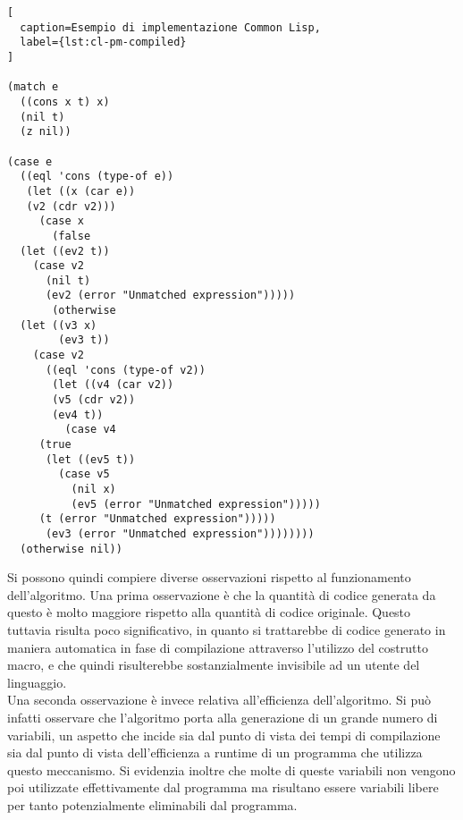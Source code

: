 
\begin{lstlisting}[
  caption=Esempio di implementazione Common Lisp,
  label={lst:cl-pm-compiled}
]

(match e
  ((cons x t) x)
  (nil t)
  (z nil))

(case e
  ((eql 'cons (type-of e))
   (let ((x (car e))
   (v2 (cdr v2)))
     (case x
       (false
  (let ((ev2 t))
    (case v2
      (nil t)
      (ev2 (error "Unmatched expression")))))
       (otherwise
  (let ((v3 x)
        (ev3 t))
    (case v2
      ((eql 'cons (type-of v2))
       (let ((v4 (car v2))
       (v5 (cdr v2))
       (ev4 t))
         (case v4
     (true
      (let ((ev5 t))
        (case v5
          (nil x)
          (ev5 (error "Unmatched expression")))))
     (t (error "Unmatched expression")))))
      (ev3 (error "Unmatched expression"))))))))
  (otherwise nil))

\end{lstlisting}

Si possono quindi compiere diverse osservazioni rispetto al funzionamento
dell'algoritmo. Una prima osservazione è che la quantità di codice generata da
questo è molto maggiore rispetto alla quantità di codice originale. Questo
tuttavia risulta poco significativo, in quanto si trattarebbe di codice generato
in maniera automatica in fase di compilazione attraverso l'utilizzo del
costrutto macro, e che quindi risulterebbe sostanzialmente invisibile ad un
utente del linguaggio.\\

Una seconda osservazione è invece relativa all'efficienza dell'algoritmo. Si può
infatti osservare che l'algoritmo porta alla generazione di un grande numero di
variabili, un aspetto che incide sia dal punto di vista dei tempi di
compilazione sia dal punto di vista dell'efficienza a runtime di un programma
che utilizza questo meccanismo. Si evidenzia inoltre che molte di queste
variabili non vengono poi utilizzate effettivamente dal programma ma risultano
essere variabili libere per tanto potenzialmente eliminabili dal programma.\\

